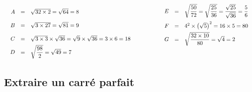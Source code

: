 \begin{methode}
	\begin{correction}

		\[
			\def\arraystretch{2}%
			\begin{array}{rr}
				\begin{array}{rcl}
					A & = & \sqrt{32 \times 2} = \sqrt{64} = 8                                               \\
					B & = & \sqrt{3 \times 27} = \sqrt{81} = 9                                               \\
					C & = & \sqrt{3 \times 3} \times \sqrt{36} = \sqrt{9} \times \sqrt{36} = 3 \times 6 = 18 \\
					D & = & \sqrt{\dfrac{98}{2}} = \sqrt{49} = 7                                             \\
				\end{array}%
				\qquad & \qquad %
				\begin{array}{rcl}
					E & = & \sqrt{\dfrac{50}{72}} = \sqrt{\dfrac{25}{36}} = \dfrac{\sqrt{25}}{\sqrt{36}} = \dfrac{5}{6} \\
					F & = & 4^2 \times \left( \sqrt{5} \right)^2 = 16 \times 5 = 80                                     \\
					G & = & \sqrt{\dfrac{32 \times 10}{80}} = \sqrt{4} = 2                                              \\
					  &   &
				\end{array}
			\end{array}
		\]

	\end{correction}
\end{methode}

\subsection{Extraire un carré parfait}

